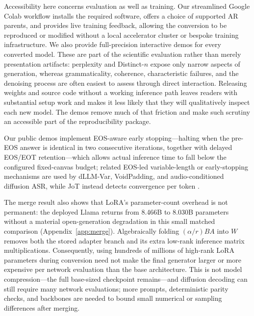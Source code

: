 \documentclass{article}
\begin{document}
Accessibility here concerns evaluation as well as training. Our streamlined Google Colab workflow installs the required software, offers a choice of supported AR parents, and provides live training feedback, allowing the conversion to be reproduced or modified without a local accelerator cluster or bespoke training infrastructure. We also provide full-precision interactive demos for every converted model. These are part of the scientific evaluation rather than merely presentation artifacts: perplexity and Distinct-$n$ expose only narrow aspects of generation, whereas grammaticality, coherence, characteristic failures, and the denoising process are often easiest to assess through direct interaction. Releasing weights and source code without a working inference path leaves readers with substantial setup work and makes it less likely that they will qualitatively inspect each new model. The demos remove much of that friction and make such scrutiny an accessible part of the reproducibility package.

Our public demos implement EOS-aware early stopping---halting when the pre-EOS answer is identical in two consecutive iterations, together with delayed EOS/EOT retention---which allows actual inference time to fall below the configured fixed-canvas budget; related EOS-led variable-length or early-stopping mechanisms are used by dLLM-Var, VoidPadding, and audio-conditioned diffusion ASR, while JoT instead detects convergence per token \citep{yang2025dllmvar,liu2026voidpadding,wang2026audioconditioned,kohut2026just}.

The merge result also shows that LoRA's parameter-count overhead is not permanent: the deployed Llama returns from 8.466B to 8.030B parameters without a material open-generation degradation in this small matched comparison (Appendix~\ref{app:merge}). Algebraically folding $(\alpha/r)BA$ into $W$ removes both the stored adapter branch and its extra low-rank inference matrix multiplications. Consequently, using hundreds of millions of high-rank LoRA parameters during conversion need not make the final generator larger or more expensive per network evaluation than the base architecture. This is not model compression---the full base-sized checkpoint remains---and diffusion decoding can still require many network evaluations; more prompts, deterministic parity checks, and backbones are needed to bound small numerical or sampling differences after merging.
\end{document}
